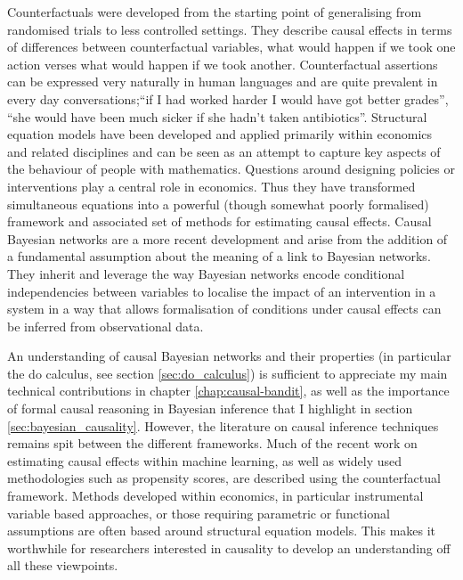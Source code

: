 \documentclass[11pt,a4paper,oneside]{book}
\newcommand{\quotes}[1]{``#1''}
\theoremstyle{plain}
\theoremstyle{definition}
\begin{document}
Counterfactuals \citep{Rubin1974} were developed from the starting point of generalising from randomised trials to less controlled settings. They describe causal effects in terms of differences between counterfactual variables, what would happen if we took one action verses what would happen if we took another. Counterfactual assertions can be expressed very naturally in human languages and are quite prevalent in  every day conversations;\quotes{if I had worked harder I would have got better grades}, \quotes{she would have been much sicker if she hadn't taken antibiotics}. Structural equation models have been developed and applied primarily within economics and related disciplines and can be seen as an attempt to capture key aspects of the behaviour of people with mathematics. Questions around designing policies or interventions play a central role in economics. Thus they have transformed simultaneous equations into a powerful (though somewhat poorly formalised) framework and associated set of methods for estimating causal effects. Causal Bayesian networks \citep{Pearl2000} are a more recent development and arise from the addition of a fundamental assumption about the meaning of a link to Bayesian networks. They inherit and leverage the way Bayesian networks encode conditional independencies between variables to localise the impact of an intervention in a system in a way that allows formalisation of conditions under causal effects can be inferred from observational data. 

An understanding of causal Bayesian networks and their properties (in particular the do calculus, see section \ref{sec:do_calculus}) is sufficient to appreciate my main technical contributions in chapter \ref{chap:causal-bandit}, as well as the importance of formal causal reasoning in Bayesian inference that I highlight in section  \ref{sec:bayesian_causality}. However, the literature on causal inference techniques remains spit between the different frameworks. Much of the recent work on estimating causal effects within machine learning, as well as widely used methodologies such as propensity scores, are described using the counterfactual framework. Methods developed within economics, in particular instrumental variable based approaches, or those requiring parametric or functional assumptions are often based around structural equation models. This makes it worthwhile for researchers interested in causality to develop an understanding off all these viewpoints.
\end{document}
